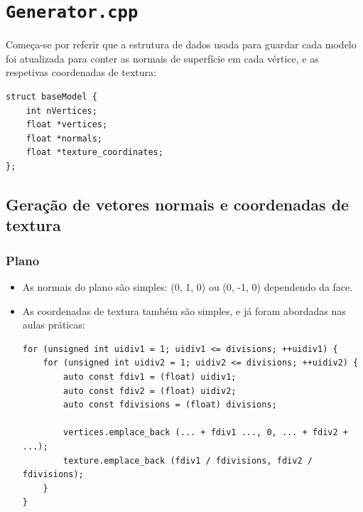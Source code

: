 \documentclass[11pt,a4paper]{report}%
\begin{document}

\section{\texttt{Generator.cpp}}

Começa-se por referir que a estrutura de dados usada para guardar cada modelo foi atualizada
para conter as normais de superfície em cada vértice, e as respetivas coordenadas de textura:

\begin{lstlisting}
struct baseModel {
    int nVertices;
    float *vertices;
    float *normals;
    float *texture_coordinates;
};
\end{lstlisting}

\subsection{Geração de vetores normais e coordenadas de textura}

\subsubsection{Plano}

\begin{itemize}
    \item As normais do plano são simples: (0, 1, 0) ou (0, -1, 0) dependendo da face.
    \item As coordenadas de textura também são simples, e já foram abordadas nas aulas práticas:

\label{code:plane_texCoord}
\begin{lstlisting}
for (unsigned int uidiv1 = 1; uidiv1 <= divisions; ++uidiv1) {
    for (unsigned int uidiv2 = 1; uidiv2 <= divisions; ++uidiv2) {
        auto const fdiv1 = (float) uidiv1;
        auto const fdiv2 = (float) uidiv2;
        auto const fdivisions = (float) divisions;

        vertices.emplace_back (... + fdiv1 ..., 0, ... + fdiv2 + ...);
        texture.emplace_back (fdiv1 / fdivisions, fdiv2 / fdivisions);
    }
}
\end{lstlisting}

\end{itemize}
\end{document}
